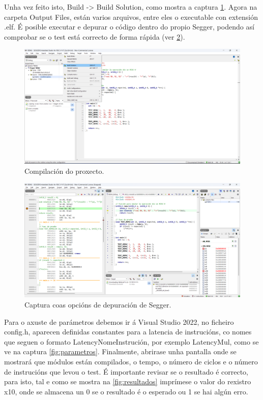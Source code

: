 Unha vez feito isto,  Build -> Build Solution, como mostra a captura \ref{fig:compilar}. Agora na carpeta Output Files, están varios arquivos, entre eles o executable con extensión .elf. É posible executar e depurar o código dentro do propio Segger, podendo así comprobar se o test está correcto de forma rápida (ver \ref{fig:cap3}).

\begin{figure}[hp!]
  \centering
  \includegraphics[width=\textwidth]{imaxes/Cap_3_Comp.png}
  \caption{Compilación do proxecto.}
  \label{fig:compilar}
\end{figure}

\begin{figure}[hp!]
  \centering
  \includegraphics[width=\textwidth]{imaxes/Cap_4_Debug.png}
  \caption{Captura coas opcións de depuración de Segger.}
  \label{fig:cap3}
\end{figure}

Para o axuste de parámetros debemos ir á Visual Studio 2022, no ficheiro config.h, aparecen definidas constantes para a latencia de instrucións, co nomes que seguen o formato LatencyNomeInstrución, por exemplo LatencyMul, como se ve na captura \ref{fig:parametros}. Finalmente, abrirase unha pantalla onde se mostrará que módulos están compilados, o tempo, o número de ciclos e o número de instrucións que levou o test. É importante revisar se o resultado é correcto, para isto, tal e como se mostra na \ref{fig:resultados} imprímese o valor do rexistro x10, onde se almacena un 0 se o resultado é o esperado ou 1 se hai algún erro.

